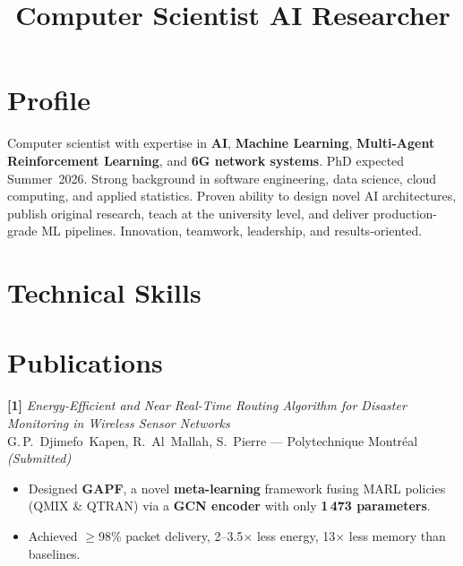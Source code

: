 \documentclass[10pt,a4paper,sans]{moderncv}
\title{Computer Scientist \textbar{} AI Researcher}
\begin{document}
\makecvtitle
\vspace{-1.8em}

\section{Profile}
Computer scientist with expertise in \textbf{AI}, \textbf{Machine Learning},
\textbf{Multi-Agent Reinforcement Learning}, and \textbf{6G network systems}.
PhD expected Summer~2026. Strong background in software engineering, data
science, cloud computing, and applied statistics. Proven ability to design novel
AI architectures, publish original research, teach at the university level, and
deliver production-grade ML pipelines. Innovation, teamwork, leadership, and
results-oriented.

\section{Technical Skills}

\section{Publications}

\textbf{[1]} \textit{Energy-Efficient and Near Real-Time Routing Algorithm for
Disaster Monitoring in Wireless Sensor Networks}\\
G.\,P.~Djimefo~Kapen, R.~Al~Mallah, S.~Pierre --- Polytechnique
Montréal \hfill \textit{(Submitted)}
\begin{itemize}[leftmargin=1.5em, topsep=2pt, itemsep=0pt, parsep=0pt]
  \item Designed \textbf{GAPF}, a novel \textbf{meta-learning} framework fusing
        MARL policies (QMIX \& QTRAN) via a \textbf{GCN encoder} with only
        \textbf{1\,473 parameters}.
  \item Achieved $\geq$98\% packet delivery, 2--3.5$\times$ less energy,
        13$\times$ less memory than baselines.
\end{itemize}
\end{document}
